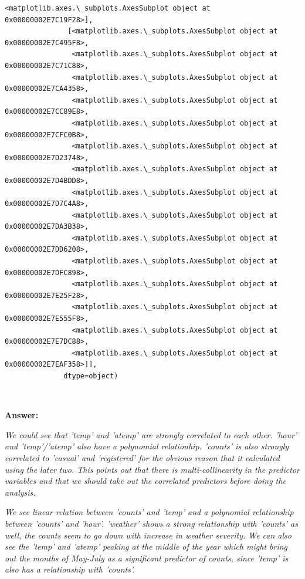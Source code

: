 \documentclass[11pt]{article}
\begin{document}
\begin{Verbatim}[commandchars=\\\{\}]
                <matplotlib.axes.\_subplots.AxesSubplot object at 0x00000002E7C19F28>],
               [<matplotlib.axes.\_subplots.AxesSubplot object at 0x00000002E7C495F8>,
                <matplotlib.axes.\_subplots.AxesSubplot object at 0x00000002E7C71C88>,
                <matplotlib.axes.\_subplots.AxesSubplot object at 0x00000002E7CA4358>,
                <matplotlib.axes.\_subplots.AxesSubplot object at 0x00000002E7CC89E8>,
                <matplotlib.axes.\_subplots.AxesSubplot object at 0x00000002E7CFC0B8>,
                <matplotlib.axes.\_subplots.AxesSubplot object at 0x00000002E7D23748>,
                <matplotlib.axes.\_subplots.AxesSubplot object at 0x00000002E7D4BDD8>,
                <matplotlib.axes.\_subplots.AxesSubplot object at 0x00000002E7D7C4A8>,
                <matplotlib.axes.\_subplots.AxesSubplot object at 0x00000002E7DA3B38>,
                <matplotlib.axes.\_subplots.AxesSubplot object at 0x00000002E7DD6208>,
                <matplotlib.axes.\_subplots.AxesSubplot object at 0x00000002E7DFC898>,
                <matplotlib.axes.\_subplots.AxesSubplot object at 0x00000002E7E25F28>,
                <matplotlib.axes.\_subplots.AxesSubplot object at 0x00000002E7E555F8>,
                <matplotlib.axes.\_subplots.AxesSubplot object at 0x00000002E7E7DC88>,
                <matplotlib.axes.\_subplots.AxesSubplot object at 0x00000002E7EAF358>]],
              dtype=object)
\end{Verbatim}
            
    \begin{center}
    \end{center}
    { \hspace*{\fill} \\}
    
    \textbf{Answer:}

\emph{We could see that 'temp' and 'atemp' are strongly correlated to
each other. 'hour' and 'temp'/'atemp' also have a polynomial
relationhip. 'counts' is also strongly correlated to 'casual' and
'registered' for the obvious reason that it calculated using the later
two. This points out that there is multi-collinearity in the predictor
variables and that we should take out the correlated predictors before
doing the analysis.}

\emph{We see linear relation between 'counts' and 'temp' and a
polynomial relationship between 'counts' and 'hour'. 'weather' shows a
strong relationship with 'counts' as well, the counts seem to go down
with increase in weather severity. We can also see the 'temp' and
'atemp' peaking at the middle of the year which might bring out the
months of May-July as a significant predictor of counts, since 'temp' is
also has a relationship with 'counts'.}
\end{document}
